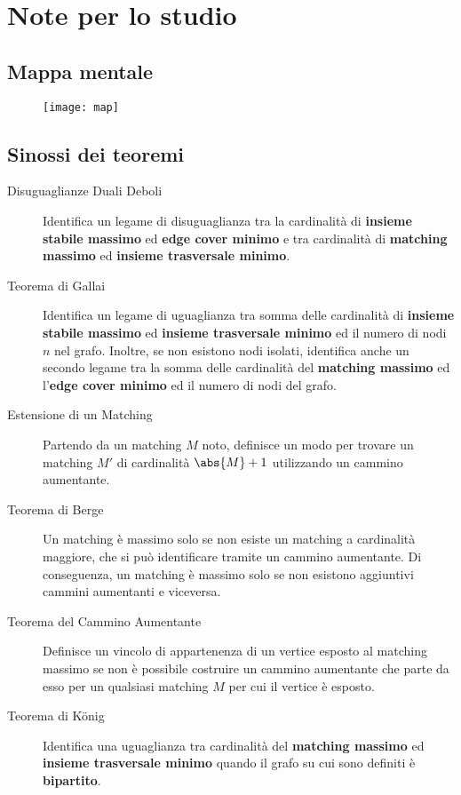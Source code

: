 \documentclass[\main/main.tex]{subfiles}
\begin{document}
\chapter{Note per lo studio}
\section{Mappa mentale}
\begin{figure}
	\texttt{[image: map]}
\end{figure}
\clearpage
\section{Sinossi dei teoremi}
\begin{multicols}{2}
	\begin{description}
		\item[Disuguaglianze Duali Deboli] Identifica un legame di disuguaglianza tra la cardinalità di \textbf{insieme stabile massimo} ed \textbf{edge cover minimo} e tra cardinalità di \textbf{matching massimo} ed \textbf{insieme trasversale minimo}.
		\item[Teorema di Gallai] Identifica un legame di uguaglianza tra somma delle cardinalità di \textbf{insieme stabile massimo} ed \textbf{insieme trasversale minimo} ed il numero di nodi \(n\) nel grafo. Inoltre, se non esistono nodi isolati, identifica anche un secondo legame tra la somma delle cardinalità del \textbf{matching massimo} ed l'\textbf{edge cover minimo} ed il numero di nodi del grafo.
		\item[Estensione di un Matching] Partendo da un matching \(M\) noto, definisce un modo per trovare un matching \(M'\) di cardinalità \(\abs{M}+1\) utilizzando un cammino aumentante.
		\item[Teorema di Berge] Un matching è massimo solo se non esiste un matching a cardinalità maggiore, che si può identificare tramite un cammino aumentante. Di conseguenza, un matching è massimo solo se non esistono aggiuntivi cammini aumentanti e viceversa.
		\item[Teorema del Cammino Aumentante] Definisce un vincolo di appartenenza di un vertice esposto al matching massimo se non è possibile costruire un cammino aumentante che parte da esso per un qualsiasi matching \(M\) per cui il vertice è esposto.
		\item[Teorema di König] Identifica una uguaglianza tra cardinalità del \textbf{matching massimo} ed \textbf{insieme trasversale minimo} quando il grafo su cui sono definiti è \textbf{bipartito}.

\end{description}
\end{multicols}
\end{document}
